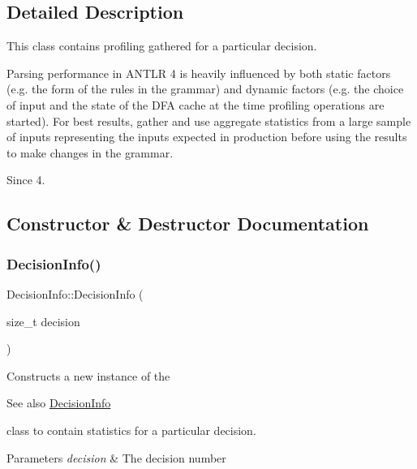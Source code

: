 \subsection{Detailed Description}
This class contains profiling gathered for a particular decision. 

Parsing performance in A\+N\+T\+LR 4 is heavily influenced by both static factors (e.\+g. the form of the rules in the grammar) and dynamic factors (e.\+g. the choice of input and the state of the D\+FA cache at the time profiling operations are started). For best results, gather and use aggregate statistics from a large sample of inputs representing the inputs expected in production before using the results to make changes in the grammar.

\begin{DoxySince}{Since}
4. 
\end{DoxySince}


\subsection{Constructor \& Destructor Documentation}
\mbox{\label{classantlr4_1_1atn_1_1DecisionInfo_a99833736f88c09563a01b57284742b88}} 
\subsubsection{\texorpdfstring{Decision\+Info()}{DecisionInfo()}}
{\footnotesize\ttfamily Decision\+Info\+::\+Decision\+Info (\begin{DoxyParamCaption}\item[{size\+\_\+t}]{decision }\end{DoxyParamCaption})}



Constructs a new instance of the \begin{DoxySeeAlso}{See also}
\hyperlink{classantlr4_1_1atn_1_1DecisionInfo}{Decision\+Info}


\end{DoxySeeAlso}
class to contain statistics for a particular decision. 


\begin{DoxyParams}{Parameters}
{\em decision} & The decision number \\
\hline
\end{DoxyParams}


